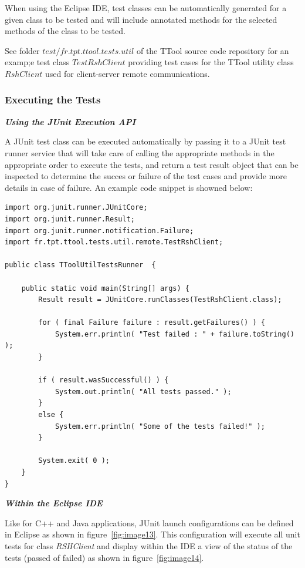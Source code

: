 \documentclass[12pt]{article}
\begin{document}
When using the Eclipse IDE, test classes can be automatically generated for a
given class to be tested and will include annotated methods for the selected
methods of the class to be tested.

See folder $test/fr.tpt.ttool.tests.util$ of the TTool source code repository
for an examp;e test class $TestRshClient$ providing test cases for the TTool
utility class $RshClient$ used for client-server remote communications.

\subsubsection{Executing the Tests}

\textbf{\emph{Using the JUnit Execution API}}

A JUnit test class can be executed automatically by passing
it to a JUnit test runner service that will take care of calling the appropriate
methods in the appropriate order to execute the tests, and return a test result
object that can be inspected to determine the succes or failure of the test
cases and provide more details in case of failure. An example code snippet is
showned below:

\begin{verbatim}
import org.junit.runner.JUnitCore;
import org.junit.runner.Result;
import org.junit.runner.notification.Failure;
import fr.tpt.ttool.tests.util.remote.TestRshClient;

public class TToolUtilTestsRunner  {

    public static void main(String[] args) {
        Result result = JUnitCore.runClasses(TestRshClient.class);

        for ( final Failure failure : result.getFailures() ) { 
            System.err.println( "Test failed : " + failure.toString() );
        }
 		
        if ( result.wasSuccessful() ) {
            System.out.println( "All tests passed." );
        }
        else {
            System.err.println( "Some of the tests failed!" );
        }
 
        System.exit( 0 );
    }
}
\end{verbatim}

\textbf{\emph{Within the Eclipse IDE}}

Like for C++ and Java applications, JUnit launch configurations can be defined
in Eclipse as shown in figure~\ref{fig:image13}. This configuration will execute all unit tests
for class \textit{RSHClient} and display within the IDE a view of the status of
the tests (passed of failed) as shown in figure~\ref{fig:image14}.
\end{document}
